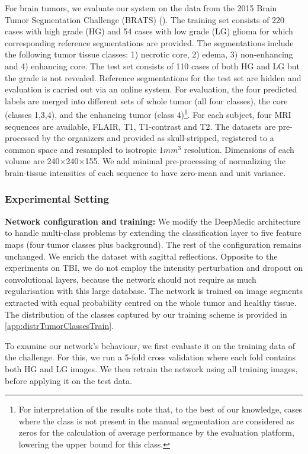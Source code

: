 For brain tumors, we evaluate our system on the data from the 2015 Brain Tumor Segmentation Challenge (BRATS) (\cite{Menze2014}). The training set consists of 220 cases with high grade (HG) and 54 cases with low grade (LG) glioma for which corresponding reference segmentations are provided. The segmentations include the following tumor tissue classes: 1) necrotic core, 2) edema, 3) non-enhancing and 4) enhancing core. The test set consists of 110 cases of both HG and LG but the grade is not revealed. Reference segmentations for the test set are hidden and evaluation is carried out via an online system. For evaluation, the four predicted labels are merged into different sets of whole tumor (all four classes), the core (classes 1,3,4), and the enhancing tumor (class 4)\footnote{For interpretation of the results note that, to the best of our knowledge, cases where the  class is not present in the manual segmentation are considered as zeros for the calculation of average performance by the evaluation platform, lowering the upper bound for this class.}. For each subject, four MRI sequences are available, FLAIR, T1, T1-contrast and T2. The datasets are pre-processed by the organizers and provided as skull-stripped, registered to a common space and resampled to isotropic $1mm^3$ resolution. Dimensions of each volume are 240$\times$240$\times$155. We add minimal pre-processing of normalizing the brain-tissue intensities of each sequence to have zero-mean and unit variance.


\subsubsection{Experimental Setting}

\textbf{Network configuration and training:} We modify the DeepMedic architecture to handle multi-class problems by extending the classification layer to five feature maps (four tumor classes plus background). The rest of the configuration remains unchanged. We enrich the dataset with sagittal reflections. Opposite to the experiments on TBI, we do not employ the intensity perturbation and dropout on convolutional layers, because the network should not require as much regularisation with this large database. The network is trained on image segments extracted with equal probability centred on the whole tumor and healthy tissue. The distribution of the classes captured by our training scheme is provided in \ref{app:distrTumorClassesTrain}.

To examine our network's behaviour, we first evaluate it on the training data of the challenge. For this, we run a 5-fold cross validation where each fold contains both HG and LG images. We then retrain the network using all training images, before applying it on the test data.

